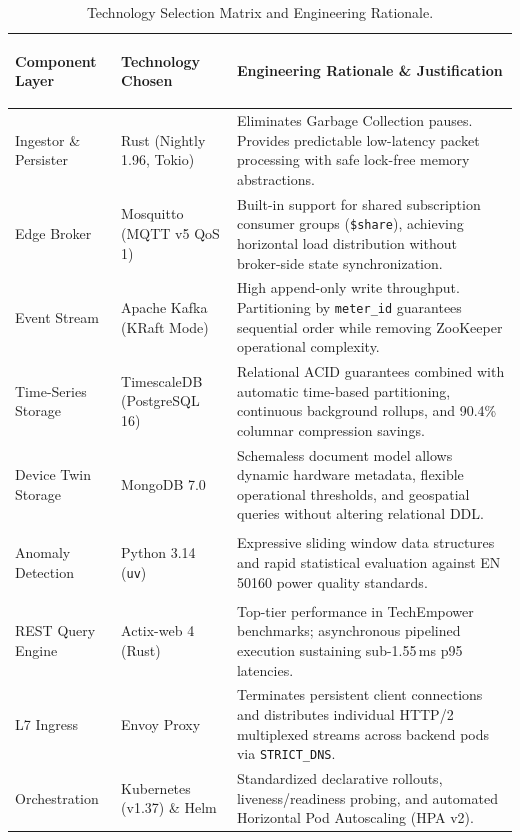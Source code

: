 \documentclass[11pt,a4paper]{article}
\begin{document}
\begin{table}[htbp]
\centering
\small
\setlength{\tabcolsep}{5pt}
\begin{tabularx}{\linewidth}{>{\bfseries\raggedright\arraybackslash}p{3.2cm} >{\raggedright\arraybackslash}p{3.8cm} X}
\toprule
\textbf{Component Layer} & \textbf{Technology Chosen} & \textbf{Engineering Rationale \& Justification} \\
\midrule
Ingestor \& Persister & Rust (Nightly 1.96, Tokio) & Eliminates Garbage Collection pauses. Provides predictable low-latency packet processing with safe lock-free memory abstractions. \\
\addlinespace
Edge Broker & Mosquitto (MQTT v5 QoS 1) & Built-in support for shared subscription consumer groups (\texttt{\$share}), achieving horizontal load distribution without broker-side state synchronization. \\
\addlinespace
Event Stream & Apache Kafka (KRaft Mode) & High append-only write throughput. Partitioning by \texttt{meter\_id} guarantees sequential order while removing ZooKeeper operational complexity. \\
\addlinespace
Time-Series Storage & TimescaleDB (PostgreSQL 16) & Relational ACID guarantees combined with automatic time-based partitioning, continuous background rollups, and 90.4\% columnar compression savings. \\
\addlinespace
Device Twin Storage & MongoDB 7.0 & Schemaless document model allows dynamic hardware metadata, flexible operational thresholds, and geospatial queries without altering relational DDL. \\
\addlinespace
Anomaly Detection & Python 3.14 (\texttt{uv}) & Expressive sliding window data structures and rapid statistical evaluation against EN 50160 power quality standards. \\
\addlinespace
REST Query Engine & Actix-web 4 (Rust) & Top-tier performance in TechEmpower benchmarks; asynchronous pipelined execution sustaining sub-1.55\,ms p95 latencies. \\
\addlinespace
L7 Ingress & Envoy Proxy & Terminates persistent client connections and distributes individual HTTP/2 multiplexed streams across backend pods via \texttt{STRICT\_DNS}. \\
\addlinespace
Orchestration & Kubernetes (v1.37) \& Helm & Standardized declarative rollouts, liveness/readiness probing, and automated Horizontal Pod Autoscaling (HPA v2). \\
\bottomrule
\end{tabularx}
\caption{Technology Selection Matrix and Engineering Rationale.}
\label{tab:tech_justification}
\end{table}
\end{document}
